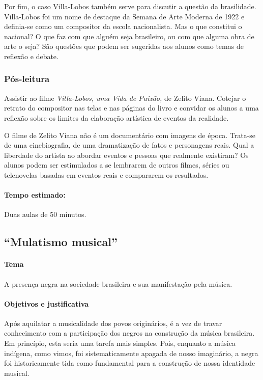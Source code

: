 \documentclass[11pt]{extarticle}
\begin{document}
Por fim, o caso Villa-Lobos também serve para discutir a questão da
brasilidade. Villa-Lobos foi um nome de destaque da Semana de Arte
Moderna de 1922 e definia-se como um compositor da escola nacionalista.
Mas o que constitui o nacional? O que faz com que alguém seja
brasileiro, ou com que alguma obra de arte o seja? São questões que
podem ser sugeridas aos alunos como temas de reflexão e debate.

\subsubsection{Pós-leitura}

Assistir ao filme \emph{Villa-Lobos, uma Vida de Paixão,} de Zelito
Viana. Cotejar o retrato do compositor nas telas e nas páginas do livro 
e convidar os alunos a uma reflexão sobre os limites da elaboração
artística de eventos da realidade.

O filme de Zelito Viana não é um documentário com imagens de época.
Trata-se de uma cinebiografia, de uma dramatização de fatos e
personagens reais. Qual a liberdade do artista ao abordar eventos e
pessoas que realmente existiram? Os alunos podem ser estimulados a se
lembrarem de outros filmes, séries ou telenovelas basadas em eventos
reais e compararem os resultados.

\paragraph{Tempo estimado:} Duas aulas de 50 minutos.


\subsection{“Mulatismo musical”}

\paragraph{Tema} A presença negra na sociedade brasileira e sua manifestação pela música.

\paragraph{Objetivos e justificativa}

Após aquilatar a musicalidade dos povos originários, é a vez de travar
conhecimento com a participação dos negros na construção da música brasileira.
Em princípio, esta seria uma tarefa mais simples. Pois, enquanto a música
indígena, como vimos, foi sistematicamente apagada de nosso imaginário, a negra
foi historicamente tida como fundamental para a construção de nossa identidade
musical.
\end{document}
